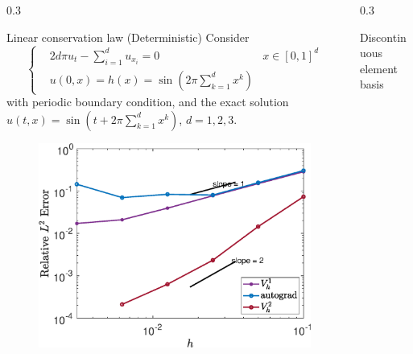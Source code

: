 \documentclass{msuposter}
\newcommand{\colwidth}{0.3\linewidth}
\begin{document}
\begin{frame}{}
\begin{columns}[t]
\begin{column}{\colwidth}
\begin{exampleblock}{Linear conservation law (Deterministic)}
\large
Consider 
 \begin{equation}\label{eqn:linear}
 \left\{
 \begin{aligned}
 	 &2d\pi u_t - \sum_{i=1}^d u_{x_i} = 0 & x\in [0,1]^d\\
 	 &u(0,x) = h(x) = \sin( 2 \pi \sum_{k=1}^d x^k)
 \end{aligned}\right.
 \end{equation}
 with periodic boundary condition, and the exact solution  $u(t,x) = \sin(t + 2 \pi \sum_{k=1}^d x^k)$, $d = 1,2,3$.
\begin{figure}
\includegraphics[width = 0.8 \linewidth]{Figure_linear_cv.eps}
\end{figure}
\end{exampleblock}
\end{column}



\begin{column}{\colwidth}
\begin{block}{Discontinuous element basis}

\begin{figure}[ht]
\centering
{}
\end{figure}
\end{block}
\end{column}
\end{columns}
\end{frame}
\end{document}

